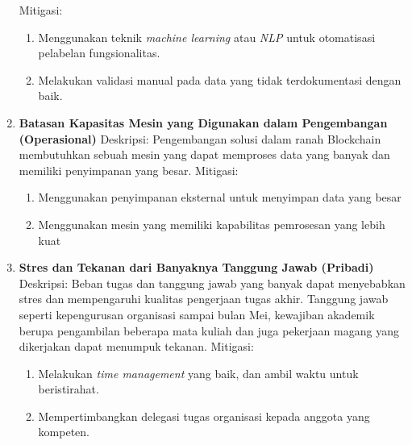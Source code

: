 \begin{enumerate}
  Mitigasi:  
  \begin{enumerate}
    \item Menggunakan teknik \textit{machine learning} atau \textit{NLP} untuk otomatisasi pelabelan fungsionalitas.  
    \item Melakukan validasi manual pada data yang tidak terdokumentasi dengan baik.
  \end{enumerate}
  \item \textbf{Batasan Kapasitas Mesin yang Digunakan dalam Pengembangan (Operasional)} \newline
  Deskripsi: Pengembangan solusi dalam ranah Blockchain membutuhkan sebuah mesin yang dapat memproses data yang banyak dan memiliki penyimpanan yang besar. \newline
  Mitigasi:
  \begin{enumerate}
    \item Menggunakan penyimpanan eksternal untuk menyimpan data yang besar
    \item Menggunakan mesin yang memiliki kapabilitas pemrosesan yang lebih kuat
  \end{enumerate}
  \item \textbf{Stres dan Tekanan dari Banyaknya Tanggung Jawab (Pribadi)}  \newline
  Deskripsi: Beban tugas dan tanggung jawab yang banyak dapat menyebabkan stres dan mempengaruhi kualitas pengerjaan tugas akhir. Tanggung jawab seperti kepengurusan organisasi sampai bulan Mei, kewajiban akademik berupa pengambilan beberapa mata kuliah dan juga pekerjaan magang yang dikerjakan dapat menumpuk tekanan. \newline 
  Mitigasi:  
  \begin{enumerate}
    \item Melakukan \textit{time management} yang baik, dan ambil waktu untuk beristirahat.  
    \item Mempertimbangkan delegasi tugas organisasi kepada anggota yang kompeten.
  \end{enumerate}
\end{enumerate}